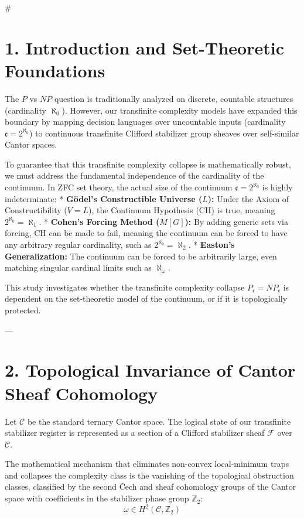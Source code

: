 \documentclass[11pt,twocolumn]{article}
\begin{document}
#

\section{1. Introduction and Set-Theoretic Foundations}
The $P$ vs $NP$ question is traditionally analyzed on discrete, countable structures (cardinality $\aleph_0$). However, our transfinite complexity models have expanded this boundary by mapping decision languages over uncountable inputs (cardinality $\mathfrak{c} = 2^{\aleph_0}$) to continuous transfinite Clifford stabilizer group sheaves over self-similar Cantor spaces.

To guarantee that this transfinite complexity collapse is mathematically robust, we must address the fundamental independence of the cardinality of the continuum. In ZFC set theory, the actual size of the continuum $\mathfrak{c} = 2^{\aleph_0}$ is highly indeterminate:
*   \textbf{Gödel's Constructible Universe ($L$):} Under the Axiom of Constructibility ($V = L$), the Continuum Hypothesis (CH) is true, meaning $2^{\aleph_0} = \aleph_1$.
*   \textbf{Cohen's Forcing Method ($M[G]$):} By adding generic sets via forcing, CH can be made to fail, meaning the continuum can be forced to have any arbitrary regular cardinality, such as $2^{\aleph_0} = \aleph_2$.
*   \textbf{Easton's Generalization:} The continuum can be forced to be arbitrarily large, even matching singular cardinal limits such as $\aleph_{\omega}$.

This study investigates whether the transfinite complexity collapse $P_{\mathfrak{c}} = NP_{\mathfrak{c}}$ is dependent on the set-theoretic model of the continuum, or if it is topologically protected.

---

\section{2. Topological Invariance of Cantor Sheaf Cohomology}
Let $\mathcal{C}$ be the standard ternary Cantor space. The logical state of our transfinite stabilizer register is represented as a section of a Clifford stabilizer sheaf $\mathcal{F}$ over $\mathcal{C}$. 

The mathematical mechanism that eliminates non-convex local-minimum traps and collapses the complexity class is the vanishing of the topological obstruction classes, classified by the second Čech and sheaf cohomology groups of the Cantor space with coefficients in the stabilizer phase group $\mathbb{Z}_2$:
$$\omega \in H^2(\mathcal{C}, \mathbb{Z}_2)$$
\end{document}
